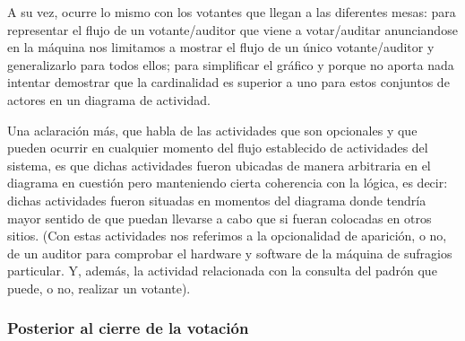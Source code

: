 \documentclass[spanish, 10pt,a4paper]{article}
\numberwithin{equation}{section} %
\begin{document}
\par 
A su vez, ocurre lo mismo con los votantes que llegan a las diferentes mesas: para representar el flujo de un votante/auditor que viene a votar/auditar anunciandose en la m\'aquina nos limitamos a mostrar el flujo de un \'unico votante/auditor y generalizarlo para todos ellos; para simplificar el gr\'afico y porque no aporta nada intentar demostrar que la cardinalidad es superior a uno para estos conjuntos de actores en un diagrama de actividad. 
\par
Una aclaraci\'on m\'as, que habla de las actividades que son opcionales y que pueden ocurrir en cualquier momento del flujo establecido de actividades del sistema, es que dichas actividades fueron ubicadas de manera arbitraria en el diagrama en cuesti\'on pero manteniendo cierta coherencia con la l\'ogica, es decir: dichas actividades fueron situadas en momentos del diagrama donde tendr\'ia mayor sentido de que puedan llevarse a cabo que si fueran colocadas en otros sitios. (Con estas actividades nos referimos a la opcionalidad de aparici\'on, o no, de un auditor para comprobar el hardware y software de la m\'aquina de sufragios particular. Y, adem\'as, la actividad relacionada con la consulta del padr\'on que puede, o no, realizar un votante).

\subsubsection{Posterior al cierre de la votación}
\end{document}
